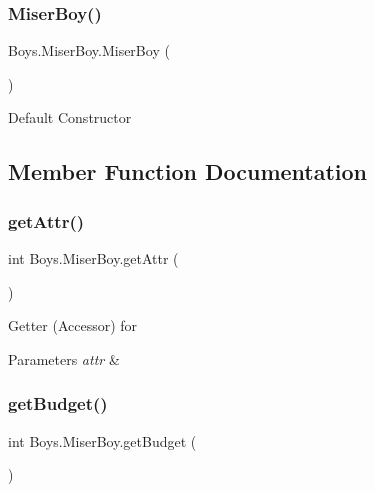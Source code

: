 \subsubsection{\texorpdfstring{Miser\+Boy()}{MiserBoy()}\hspace{0.1cm}{\footnotesize\ttfamily [2/2]}}
{\footnotesize\ttfamily Boys.\+Miser\+Boy.\+Miser\+Boy (\begin{DoxyParamCaption}{ }\end{DoxyParamCaption})\hspace{0.3cm}{\ttfamily [inline]}}

Default Constructor 

\subsection{Member Function Documentation}
\mbox{\label{class_boys_1_1_miser_boy_a0d04021ff32c7492e2d789cb97dbea0d}} 
\subsubsection{\texorpdfstring{get\+Attr()}{getAttr()}}
{\footnotesize\ttfamily int Boys.\+Miser\+Boy.\+get\+Attr (\begin{DoxyParamCaption}{ }\end{DoxyParamCaption})\hspace{0.3cm}{\ttfamily [inline]}}

Getter (Accessor) for 
\begin{DoxyParams}{Parameters}
{\em attr} & \\
\hline
\end{DoxyParams}
\mbox{\label{class_boys_1_1_miser_boy_a28d1393354b3c084e7045f30506853f7}} 
\subsubsection{\texorpdfstring{get\+Budget()}{getBudget()}}
{\footnotesize\ttfamily int Boys.\+Miser\+Boy.\+get\+Budget (\begin{DoxyParamCaption}{ }\end{DoxyParamCaption})\hspace{0.3cm}{\ttfamily [inline]}}

